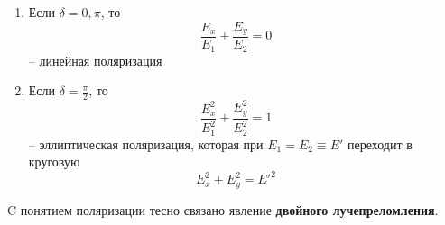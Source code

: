 \documentclass[10pt,pdf,hyperref={unicode}, dvipsnames, handout]{beamer}
\begin{document}


\begin{frame}
	\begin{columns}
		\begin{column}{0.7\textwidth}
			\begin{enumerate}
			\item Если $\delta=0, \pi$, то
			\begin{equation*}				
				\frac{E_x}{E_1}\pm\frac{E_y}{E_2}=0
			\end{equation*}
			-- линейная поляризация
			\vspace{1em}
			\item Если $\delta=\frac{\pi}{2}$, то\\
			\begin{equation*}				
				\frac{E_x^2}{E_1^2}+\frac{E_y^2}{E_2^2}=1				
			\end{equation*}			
			-- эллиптическая поляризация, которая при $E_1=E_2 \equiv E'$ переходит в круговую
			\begin{equation*}				
				E_x^2+E_y^2=E'^2
			\end{equation*}			
			\end{enumerate}	
			C понятием поляризации тесно связано явление \textbf{двойного лучепреломления}.
		\end{column}
		\begin{column}{0.3\textwidth}
\end{column}
\end{columns}
\end{frame}
\end{document}
